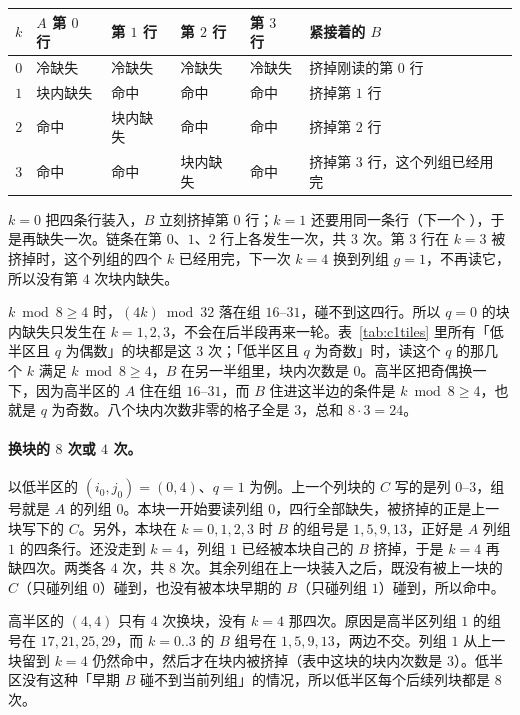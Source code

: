 \begin{center}
\small
\begin{tabular}{@{}rlllll@{}}
\toprule
$k$ & $A$ 第 $0$ 行 & 第 $1$ 行 & 第 $2$ 行 & 第 $3$ 行 & 紧接着的 $B$\\
\midrule
$0$ & 冷缺失 & 冷缺失 & 冷缺失 & 冷缺失 & 挤掉刚读的第 $0$ 行\\
$1$ & 块内缺失 & 命中 & 命中 & 命中 & 挤掉第 $1$ 行\\
$2$ & 命中 & 块内缺失 & 命中 & 命中 & 挤掉第 $2$ 行\\
$3$ & 命中 & 命中 & 块内缺失 & 命中 & 挤掉第 $3$ 行，这个列组已经用完\\
\bottomrule
\end{tabular}
\end{center}

$k=0$ 把四条行装入，$B$ 立刻挤掉第 $0$ 行；$k=1$ 还要用同一条行（下一个 ），于是再缺失一次。链条在第 $0$、$1$、$2$ 行上各发生一次，共 $3$ 次。第 $3$ 行在 $k=3$ 被挤掉时，这个列组的四个 $k$ 已经用完，下一次 $k=4$ 换到列组 $g=1$，不再读它，所以没有第 $4$ 次块内缺失。

$k\bmod 8\ge 4$ 时，$(4k)\bmod 32$ 落在组 $16$--$31$，碰不到这四行。所以 $q=0$ 的块内缺失只发生在 $k=1,2,3$，不会在后半段再来一轮。表~\ref{tab:c1tiles} 里所有「低半区且 $q$ 为偶数」的块都是这 $3$ 次；「低半区且 $q$ 为奇数」时，读这个 $q$ 的那几个 $k$ 满足 $k\bmod 8\ge 4$，$B$ 在另一半组里，块内次数是 $0$。高半区把奇偶换一下，因为高半区的 $A$ 住在组 $16$--$31$，而 $B$ 住进这半边的条件是 $k\bmod 8\ge 4$，也就是 $q$ 为奇数。八个块内次数非零的格子全是 $3$，总和 $8\cdot3=24$。

\paragraph{换块的 $8$ 次或 $4$ 次。}
以低半区的 $(i_0,j_0)=(0,4)$、$q=1$ 为例。上一个列块的 $C$ 写的是列 $0$--$3$，组号就是 $A$ 的列组 $0$。本块一开始要读列组 $0$，四行全部缺失，被挤掉的正是上一块写下的 $C$。另外，本块在 $k=0,1,2,3$ 时 $B$ 的组号是 $1,5,9,13$，正好是 $A$ 列组 $1$ 的四条行。还没走到 $k=4$，列组 $1$ 已经被本块自己的 $B$ 挤掉，于是 $k=4$ 再缺四次。两类各 $4$ 次，共 $8$ 次。其余列组在上一块装入之后，既没有被上一块的 $C$（只碰列组 $0$）碰到，也没有被本块早期的 $B$（只碰列组 $1$）碰到，所以命中。

高半区的 $(4,4)$ 只有 $4$ 次换块，没有 $k=4$ 那四次。原因是高半区列组 $1$ 的组号在 $17,21,25,29$，而 $k=0..3$ 的 $B$ 组号在 $1,5,9,13$，两边不交。列组 $1$ 从上一块留到 $k=4$ 仍然命中，然后才在块内被挤掉（表中这块的块内次数是 $3$）。低半区没有这种「早期 $B$ 碰不到当前列组」的情况，所以低半区每个后续列块都是 $8$ 次。

